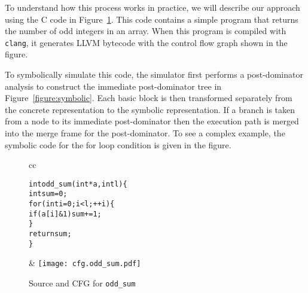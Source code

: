 \documentclass{article}
\begin{document}
To understand how this process works in practice, we will describe our approach
using the C code in Figure~\ref{figure:oddsum}.  This code contains a simple
program that returns the number of odd integers in an array.  When this
program is compiled with \texttt{clang}, it generates LLVM bytecode with the
control flow graph shown in the figure.

To symbolically simulate this code, the simulator first performs a
post-dominator analysis to construct the immediate post-dominator tree in
Figure~\ref{figure:symbolic}.  Each basic block is then transformed separately
from the concrete representation to the symbolic representation.  If a branch
is taken from a node to its immediate post-dominator then the execution path is
merged into the merge frame for the post-dominator.  To see a complex example,
the symbolic code for the for loop condition is given in the figure.

\begin{figure}[tb]
\begin{center}
\begin{tabular}{cc}
\begin{minipage}[b]{2.2in}
\begin{alltt}
int odd_sum(int* a, int l) \{
  int sum = 0;
  for (int i = 0; i < l; ++i) \{
    if (a[i] & 1) sum += 1;
  \}
  return sum;
\}



\end{alltt}
\end{minipage}
&
\texttt{[image: cfg.odd\_sum.pdf]}
\end{tabular}
\end{center}
\caption{Source and CFG for \texttt{odd\_sum}}
  \label{figure:oddsum}
\end{figure}
\end{document}
